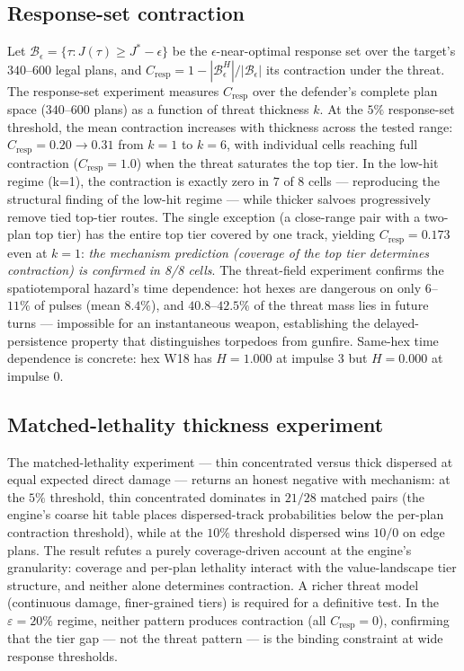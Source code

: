 \documentclass[12pt,a4paper]{article}
\begin{document}
\subsection{Response-set contraction}
Let $\mathcal B_\epsilon=\{\tau: J(\tau)\ge J^\ast-\epsilon\}$ be the
$\epsilon$-near-optimal response set over the target's $340$--$600$ legal
plans, and
$C_{\text{resp}}=1-|\mathcal B_\epsilon^{H}|/|\mathcal B_\epsilon|$
its contraction under the threat.  The response-set experiment measures $C_{\text{resp}}$ over the defender's
complete plan space ($340$--$600$ plans) as a function of threat
thickness $k$.  At the $5\%$ response-set threshold, the mean
contraction increases with thickness across the tested range: $C_{\text{resp}} =
0.20 \to 0.31$ from $k=1$ to $k=6$, with individual cells reaching
full contraction ($C_{\text{resp}} = 1.0$) when the threat saturates
the top tier.  In the low-hit regime (k=1), the contraction is exactly
zero in $7$ of $8$ cells --- reproducing the structural finding of the
low-hit regime --- while
thicker salvoes progressively remove tied top-tier routes.  The single
exception (a close-range pair with a two-plan top tier) has the entire top tier
covered by one track, yielding $C_{\text{resp}} = 0.173$ even at
$k=1$: \emph{the mechanism prediction (coverage of the top tier
determines contraction) is confirmed in 8/8 cells}.  The threat-field
experiment confirms the spatiotemporal hazard's time dependence: hot
hexes are dangerous on only $6$--$11\%$ of pulses (mean $8.4\%$),
and $40.8$--$42.5\%$ of the threat mass lies in future turns ---
impossible for an instantaneous weapon, establishing the
delayed-persistence property that distinguishes torpedoes from
gunfire.  Same-hex time dependence is concrete: hex W18 has
$H=1.000$ at impulse 3 but $H=0.000$ at impulse 0.

\subsection{Matched-lethality thickness experiment}
The matched-lethality experiment --- thin concentrated versus
thick dispersed at equal expected direct damage --- returns an honest
negative with mechanism: at the $5\%$ threshold, thin concentrated
dominates in $21/28$ matched pairs (the engine's coarse hit table
places dispersed-track probabilities below the per-plan contraction
threshold), while at the $10\%$ threshold dispersed wins $10/0$ on
edge plans.  The result refutes a purely coverage-driven account at the engine's
granularity: coverage and per-plan lethality interact with the
value-landscape tier structure, and neither alone determines
contraction.  A richer threat model
(continuous damage, finer-grained tiers) is required for a definitive
test.  In the $\varepsilon=20\%$ regime, neither pattern produces
contraction (all $C_{\text{resp}}=0$), confirming that the tier
gap --- not the threat pattern --- is the binding constraint at wide
response thresholds.
\end{document}
